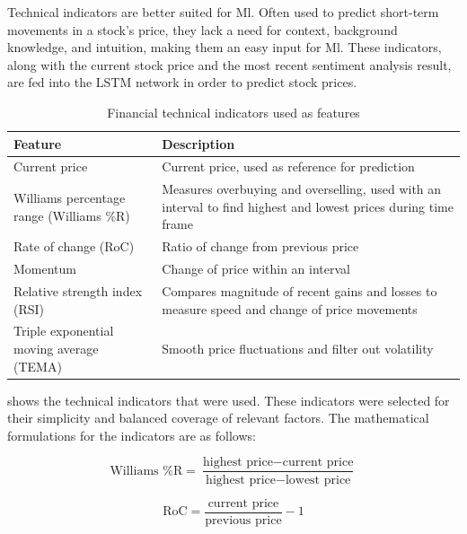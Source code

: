 \documentclass[12pt,a4paper,twoside,openright]{report}
\begin{document}
Technical indicators are better suited for Ml.
Often used to predict short-term movements in a stock's price, they lack a need for context,
background knowledge, and intuition, making them an easy input for Ml.
These indicators, along with the current stock
price and the most recent sentiment analysis result, are fed into the LSTM network in order
to predict stock prices.

\begin{table}[H]
\centering
\vspace{10pt}
\setlength{\tabcolsep}{0.3cm}
\begin{tabular}{p{5cm} p{9.5cm}}
\toprule
\textbf{Feature}          					& \textbf{Description}  \bigstrut\\ \midrule
Current price								& Current price, used as reference for prediction \bigstrut \\\midrule
Williams percentage range (Williams \%R)	& Measures overbuying and overselling, used with an interval to find highest and lowest prices during time frame  \bigstrut \\\midrule
Rate of change (RoC)						& Ratio of change from previous price  \bigstrut \\\midrule
Momentum									& Change of price within an interval  \bigstrut \\ \midrule
Relative strength index (RSI)				& Compares magnitude of recent gains and losses to measure speed and change of price movements  \bigstrut\\ \midrule
Triple exponential moving average (TEMA) 	& Smooth price fluctuations and filter out volatility  \bigstrut\\ \bottomrule

\end{tabular}
\caption{Financial technical indicators used as features}
\label{table:fintech}
\end{table}

 shows the technical indicators that were used. These indicators were selected for their
simplicity and balanced coverage of relevant factors. The mathematical formulations for the 
indicators are as follows:

\begin{equation}
\text{Williams \%R} = \frac{\text{highest price} - \text{current price}}{\text{highest price} - \text{lowest price}}
\end{equation}

\begin{equation}
\text{RoC} = \frac{\text{current price}}{\text{previous price}} - 1
\end{equation}
\end{document}

